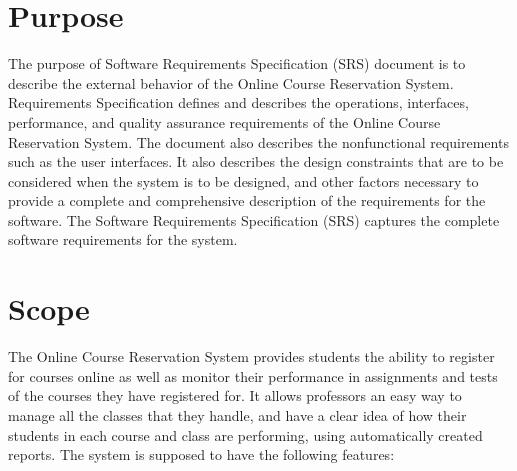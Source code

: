 \documentclass[12pt, a4]{report}
\begin{document}
\section{Purpose}
The purpose of Software Requirements Specification (SRS) document is to describe the external behavior of the Online Course Reservation System. Requirements Specification defines and describes the operations, interfaces, performance, and quality assurance requirements of the Online Course Reservation System. The document also describes the nonfunctional requirements such as the user interfaces.
It also describes the design constraints that are to be considered when the system is to be designed, and other factors necessary to provide a complete and comprehensive description of the requirements for the software. The Software Requirements Specification (SRS) captures the complete software requirements for the system.


\section{Scope}
The Online Course Reservation System provides students the ability to register for courses online as well as monitor their performance in assignments and tests of the courses they have registered for. It allows professors an easy way to manage all the classes that they handle, and have a clear idea of how their students in each course and class are performing, using automatically created reports.
The system is supposed to have the following features:
\end{document}

